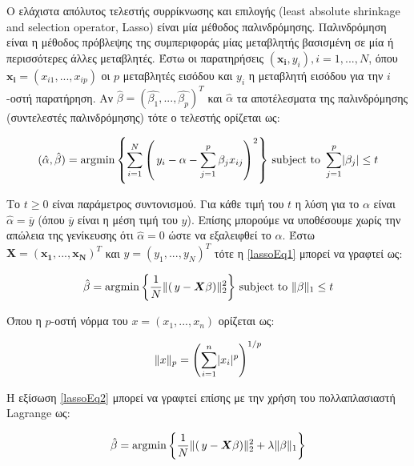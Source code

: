\documentclass[a4paper,12pt]{article}
\DeclareMathOperator*{\argmin}{\arg\!\min}
\DeclarePairedDelimiter\abs{\lvert}{\rvert}%
\DeclarePairedDelimiter\norm{\lVert}{\rVert}%
\begin{document}
Ο ελάχιστα απόλυτος τελεστής συρρίκνωσης και επιλογής (least absolute shrinkage
and selection operator, Lasso) \cite{Lasso:1} είναι μία μέθοδος παλινδρόμησης.
Παλινδρόμηση είναι η μέθοδος πρόβλεψης της συμπεριφοράς μίας μεταβλητής
βασισμένη σε μία ή περισσότερες άλλες μεταβλητές. Έστω οι παρατηρήσεις
$(\bm{x_i},y_i), i=1,...,N$, όπου $\bm{x_i}=(x_{i1},...,x_{ip})$ οι $p$
μεταβλητές εισόδου και $y_i$ η μεταβλητή εισόδου για την $i$-οστή παρατήρηση. Αν
$\hat{\beta} = (\hat{{\beta}_1},...,\hat{{\beta}_p})^T$ και $\hat{\alpha}$ τα
αποτέλεσματα της παλινδρόμησης (συντελεστές παλινδρόμησης) τότε ο τελεστής
ορίζεται ως:

\begin{equation}\label{lassoEq1}
    (\hat{\alpha}, \hat{\beta}) = 
    \argmin{\left\{\sum_{i=1}^{N} {\left(\,y_i-\alpha- \sum_{j=1}^{p}
    \beta_{j}x_{ij}\right)}^2 \right\}} 
    \text{ subject to }
    \sum_{j=1}^{p} \abs{\beta_j} \leq t
\end{equation}

Το $t \geq 0$ είναι παράμετρος συντονισμού. Για κάθε τιμή του $t$ η λύση για το
$\alpha$ είναι $\hat{\alpha}=\overline{y}$ (όπου $\overline{y}$ είναι η μέση
τιμή του $y$). Επίσης μπορούμε να υποθέσουμε χωρίς την απώλεια της γενίκευσης
ότι $\hat{\alpha}=0$ ώστε να εξαλειφθεί το $\alpha$. Έστω $\bm{X} =
(\bm{x_1},...,\bm{x_N})^T$ και $y = (y_1,...,y_N)^T$ τότε η \eqref{lassoEq1}
μπορεί να γραφτεί ως:

\begin{equation}\label{lassoEq2}
    \hat{\beta} = 
    \argmin{\left\{\frac{1}{N} \norm{\left(\,y - \bm{X} \beta\right)}_2^2
    \right\}} 
    \text{ subject to }
    \norm{\beta}_1 \leq t
\end{equation}

Όπου η $p$-οστή νόρμα του $x=(x_1,...,x_n)$ ορίζεται ως:

\begin{equation*}
    \norm{x}_p=\left( \sum_{i=1}^{n} \abs{x_i}^p\right)^{1/p}
\end{equation*}

Η εξίσωση \eqref{lassoEq2} μπορεί να γραφτεί επίσης με την χρήση του
πολλαπλασιαστή Lagrange ως:

\begin{equation}\label{lassoEq3}
    \hat{\beta} = 
    \argmin{\left\{\frac{1}{N} \norm{\left(\,y - \bm{X} \beta\right)}_2^2 +
    \lambda \norm{\beta}_1 \right\}} 
\end{equation}
\end{document}
